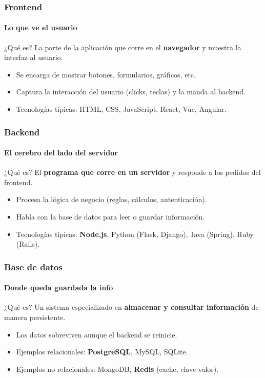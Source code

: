 
\begin{frame}
    \frametitle{Frontend}
    \framesubtitle{Lo que ve el usuario}

    \begin{block}{¿Qué es?}
        La parte de la aplicación que corre en el \textbf{navegador} y muestra la interfaz al usuario.
    \end{block}

    \begin{itemize}
        \item Se encarga de mostrar botones, formularios, gráficos, etc.
        \item Captura la interacción del usuario (clicks, teclas) y la manda al backend.
        \item Tecnologías típicas: HTML, CSS, JavaScript, React, Vue, Angular.
    \end{itemize}
\end{frame}


\begin{frame}
    \frametitle{Backend}
    \framesubtitle{El cerebro del lado del servidor}

    \begin{block}{¿Qué es?}
        El \textbf{programa que corre en un servidor} y responde a los pedidos del frontend.
    \end{block}

    \begin{itemize}
        \item Procesa la lógica de negocio (reglas, cálculos, autenticación).
        \item Habla con la base de datos para leer o guardar información.
        \item Tecnologías típicas: \textbf{Node.js}, Python (Flask, Django), Java (Spring), Ruby (Rails).
    \end{itemize}
\end{frame}


\begin{frame}
    \frametitle{Base de datos}
    \framesubtitle{Donde queda guardada la info}

    \begin{block}{¿Qué es?}
        Un sistema especializado en \textbf{almacenar y consultar información} de manera persistente.
    \end{block}

    \begin{itemize}
        \item Los datos sobreviven aunque el backend se reinicie.
        \item Ejemplos relacionales: \textbf{PostgreSQL}, MySQL, SQLite.
        \item Ejemplos no relacionales: MongoDB, \textbf{Redis} (cache, clave-valor).
    \end{itemize}
\end{frame}

